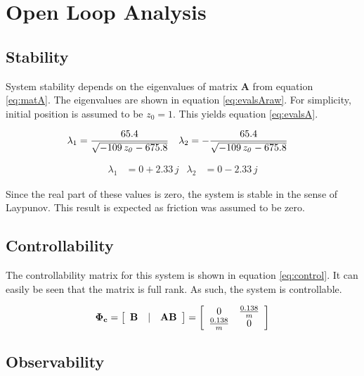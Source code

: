 \chapter{Open Loop Analysis} 

\section{Stability}

System stability depends on the eigenvalues of matrix \textbf{A} from equation \ref{eq:matA}.
The eigenvalues are shown in equation \ref{eq:evalsAraw}.
For simplicity, initial position is assumed to be $z_0=1$.
This yields equation \ref{eq:evalsA}.


\begin{align}
	\label{eq:evalsAraw}
	\lambda_1 &= {\frac {65.4}{\sqrt {- 109\,{\it z_0}- 675.8}}} & \lambda_2 &= -{\frac {65.4}{\sqrt {- 109\,{\it z_0}- 675.8}}}
\end{align}

\begin{align}
	\label{eq:evalsA}
	\lambda_1 &= 0 + 2.33\,j & \lambda_2 &=  0 - 2.33\,j
\end{align}

Since the real part of these values is zero, the system is stable in the sense of Laypunov.
This result is expected as friction was assumed to be zero.

\section{Controllability}


The controllability matrix for this system is shown in equation \ref{eq:control}.
It can easily be seen that the matrix is full rank.
As such, the system is controllable.

\begin{equation}
	\label{eq:control}
	{\bf \Phi_c} =
	 \left[
		\begin{array}{ccc}
			 {\bf B} & | & {\bf AB}\\
		\end{array}
	\right]
	= 
	\left[
		\begin{array}{cc}
			 0 & {\frac {0.138}{m}} \\
			 {\frac {0.138}{m}} & 0 \\
		\end{array}
	\right]
\end{equation}

\section{Observability}

